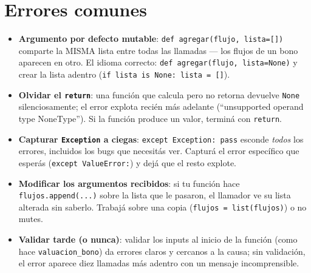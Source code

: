 \documentclass[
  spanish,
  letterpaper,
  DIV=11,
  numbers=noendperiod]{scrreprt}
\providecommand{\tightlist}{%
  \setlength{\itemsep}{0pt}\setlength{\parskip}{0pt}}
\begin{document}
\section{Errores comunes}\label{errores-comunes-1}

\begin{tcolorbox}[enhanced jigsaw, bottomrule=.15mm, colback=white, opacitybacktitle=0.6, arc=.35mm, toprule=.15mm, opacityback=0, breakable, titlerule=0mm, left=2mm, coltitle=black, colbacktitle=quarto-callout-warning-color!10!white, colframe=quarto-callout-warning-color-frame, leftrule=.75mm, toptitle=1mm, bottomtitle=1mm, title=\textcolor{quarto-callout-warning-color}{\faExclamationTriangle}\hspace{0.5em}{Trampas frecuentes}, rightrule=.15mm]

\begin{itemize}
\tightlist
\item
  \textbf{Argumento por defecto mutable}:
  \texttt{def\ agregar(flujo,\ lista={[}{]})} comparte la MISMA lista
  entre todas las llamadas --- los flujos de un bono aparecen en otro.
  El idioma correcto: \texttt{def\ agregar(flujo,\ lista=None)} y crear
  la lista adentro (\texttt{if\ lista\ is\ None:\ lista\ =\ {[}{]}}).
\item
  \textbf{Olvidar el \texttt{return}}: una función que calcula pero no
  retorna devuelve \texttt{None} silenciosamente; el error explota
  recién más adelante (``unsupported operand type NoneType''). Si la
  función produce un valor, terminá con \texttt{return}.
\item
  \textbf{Capturar \texttt{Exception} a ciegas}:
  \texttt{except\ Exception:\ pass} esconde \emph{todos} los errores,
  incluidos los bugs que necesitás ver. Capturá el error específico que
  esperás (\texttt{except\ ValueError:}) y dejá que el resto explote.
\item
  \textbf{Modificar los argumentos recibidos}: si tu función hace
  \texttt{flujos.append(...)} sobre la lista que le pasaron, el llamador
  ve su lista alterada sin saberlo. Trabajá sobre una copia
  (\texttt{flujos\ =\ list(flujos)}) o no mutes.
\item
  \textbf{Validar tarde (o nunca)}: validar los inputs al inicio de la
  función (como hace \texttt{valuacion\_bono}) da errores claros y
  cercanos a la causa; sin validación, el error aparece diez llamadas
  más adentro con un mensaje incomprensible.
\end{itemize}

\end{tcolorbox}
\end{document}
